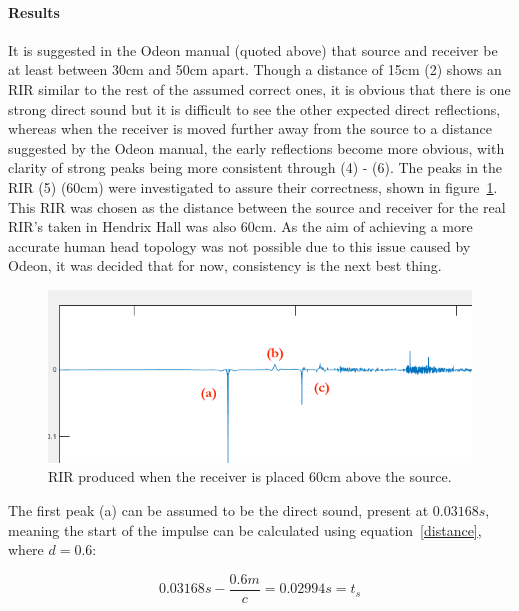 \documentclass[../../main.tex]{subfiles}
\begin{document}
			\paragraph{Results}
			\label{odeon:results}

			It is suggested in the Odeon manual (quoted above) that source and receiver be at least between 30cm and 50cm apart. Though a distance of 15cm (2) shows an \ac{RIR} similar to the rest of the assumed correct ones, it is obvious that there is one strong direct sound but it is difficult to see the other expected direct reflections, whereas when the receiver is moved further away from the source to a distance suggested by the Odeon manual, the early reflections become more obvious, with clarity of strong peaks being more consistent through (4) - (6). The peaks in the \ac{RIR} (5) (60cm) were investigated to assure their correctness, shown in figure~\ref{60cm}. This \ac{RIR} was chosen as the distance between the source and receiver for the real \ac{RIR}’s taken in Hendrix Hall was also 60cm. As the aim of achieving a more accurate human head topology was not possible due to this issue caused by Odeon, it was decided that for now, consistency is the next best thing.


			\begin{figure}[h]
				\centerline{\includegraphics[scale = 0.6]{Sections/Implementation/Odeon/images/incorrectRIR/76_60cm_editV2_crop.png}}
				\caption{\ac{RIR} produced when the receiver is placed 60cm above the source.}
				\label{60cm}
			\end{figure}


			The first peak (a) can be assumed to be the direct sound, present at $0.03168s$, meaning the start of the impulse can be calculated using equation~\ref{distance}, where $d = 0.6$:

			\begin{equation}
			0.03168s - \frac{0.6m}{c} = 0.02994s = t_s
			\end{equation}
\end{document}
